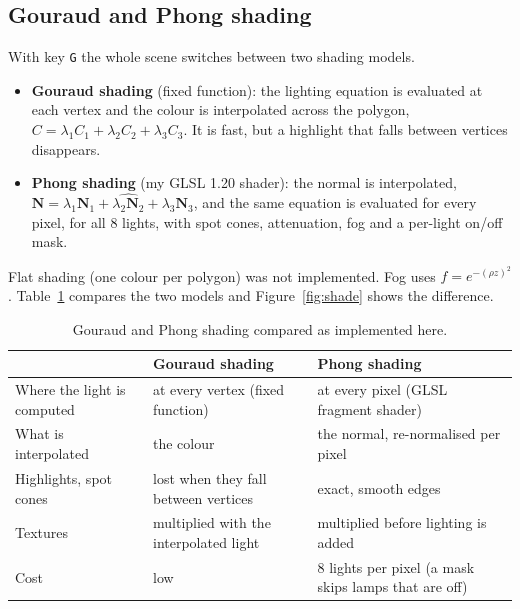 \documentclass[10pt,a4paper]{article}
\newcommand{\code}[1]{\texttt{\small #1}}
\begin{document}
\subsection{Gouraud and Phong shading}\label{sec:shade}
With key \code{G} the whole scene switches between two shading models.
\begin{itemize}
\item \textbf{Gouraud shading} (fixed function): the lighting equation is evaluated at each vertex and the colour is interpolated across the polygon, $C=\lambda_1C_1+\lambda_2C_2+\lambda_3C_3$. It is fast, but a highlight that falls between vertices disappears.
\item \textbf{Phong shading} (my GLSL 1.20 shader): the normal is interpolated, $\mathbf N=\widehat{\lambda_1\mathbf N_1+\lambda_2\mathbf N_2+\lambda_3\mathbf N_3}$, and the same equation is evaluated for every pixel, for all 8 lights, with spot cones, attenuation, fog and a per-light on/off mask.
\end{itemize}
Flat shading (one colour per polygon) was not implemented. Fog uses $f=e^{-(\rho z)^2}$. Table~\ref{tab:shade} compares the two models and Figure~\ref{fig:shade} shows the difference.
\begin{table}[htbp]
\centering\small
\begin{tabular}{@{}p{3.6cm}p{5.6cm}p{6.5cm}@{}}
\toprule
& \textbf{Gouraud shading} & \textbf{Phong shading}\\
\midrule
Where the light is computed & at every vertex (fixed function) & at every pixel (GLSL fragment shader)\\
What is interpolated & the colour & the normal, re-normalised per pixel\\
Highlights, spot cones & lost when they fall between vertices & exact, smooth edges\\
Textures & multiplied with the interpolated light & multiplied before lighting is added\\
Cost & low & 8 lights per pixel (a mask skips lamps that are off)\\
\bottomrule
\end{tabular}
\caption{Gouraud and Phong shading compared as implemented here.}\label{tab:shade}
\end{table}
\end{document}
